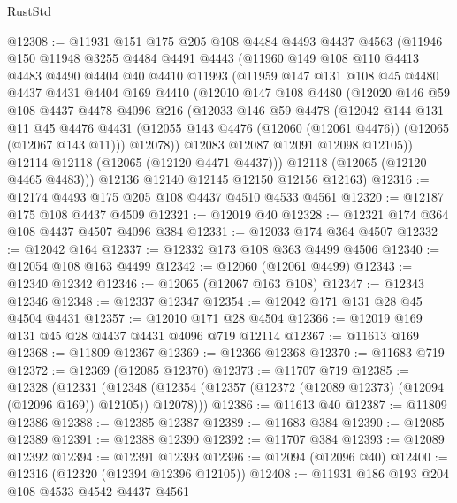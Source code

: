 \begin{lexlean}{RustStd}
\begin{coremodule}
@12308 := @11931
    @151
    @175
    @205
    @108
    @4484
    @4493
    @4437
    @4563
    (@11946
      @150
      @11948
      @3255
      @4484
      @4491
      @4443
      (@11960
        @149
        @108
        @110
        @4413
        @4483
        @4490
        @4404
        @40
        @4410
        @11993
        (@11959
          @147
          @131
          @108
          @45
          @4480
          @4437
          @4431
          @4404
          @169
          @4410
          (@12010
            @147
            @108
            @4480
            (@12020
              @146
              @59
              @108
              @4437
              @4478
              @4096
              @216
              (@12033
                @146
                @59
                @4478
                (@12042
                  @144
                  @131
                  @11
                  @45
                  @4476
                  @4431
                  (@12055 @143 @4476 (@12060 (@12061 @4476)) (@12065 (@12067 @143 @11)))
                  @12078))
              @12083
              @12087
              @12091
              @12098
              @12105))
          @12114
          @12118
          (@12065 (@12120 @4471 @4437)))
        @12118
        (@12065 (@12120 @4465 @4483)))
      @12136
      @12140
      @12145
      @12150
      @12156
      @12163)
@12316 := @12174 @4493 @175 @205 @108 @4437 @4510 @4533 @4561
@12320 := @12187 @175 @108 @4437 @4509
@12321 := @12019 @40
@12328 := @12321 @174 @364 @108 @4437 @4507 @4096 @384
@12331 := @12033 @174 @364 @4507
@12332 := @12042 @164
@12337 := @12332 @173 @108 @363 @4499 @4506
@12340 := @12054 @108 @163 @4499
@12342 := @12060 (@12061 @4499)
@12343 := @12340 @12342
@12346 := @12065 (@12067 @163 @108)
@12347 := @12343 @12346
@12348 := @12337 @12347
@12354 := @12042 @171 @131 @28 @45 @4504 @4431
@12357 := @12010 @171 @28 @4504
@12366 := @12019 @169 @131 @45 @28 @4437 @4431 @4096 @719 @12114
@12367 := @11613 @169
@12368 := @11809 @12367
@12369 := @12366 @12368
@12370 := @11683 @719
@12372 := @12369 (@12085 @12370)
@12373 := @11707 @719
@12385 := @12328
    (@12331
      (@12348 (@12354 (@12357 (@12372 (@12089 @12373) (@12094 (@12096 @169)) @12105)) @12078)))
@12386 := @11613 @40
@12387 := @11809 @12386
@12388 := @12385 @12387
@12389 := @11683 @384
@12390 := @12085 @12389
@12391 := @12388 @12390
@12392 := @11707 @384
@12393 := @12089 @12392
@12394 := @12391 @12393
@12396 := @12094 (@12096 @40)
@12400 := @12316 (@12320 (@12394 @12396 @12105))
@12408 := @11931 @186 @193 @204 @108 @4533 @4542 @4437 @4561

\end{coremodule}
\end{lexlean}
